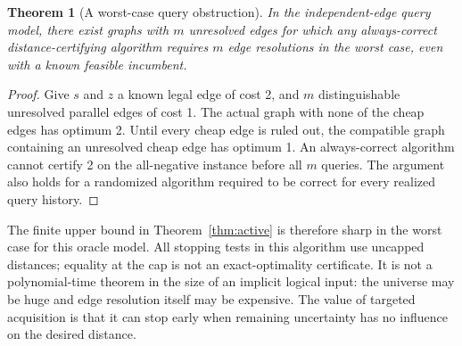 \documentclass[11pt]{article}
\newtheorem{theorem}{Theorem}[section]\newtheorem{proposition}[theorem]{Proposition}\newtheorem{lemma}[theorem]{Lemma}\newtheorem{corollary}[theorem]{Corollary}
\theoremstyle{definition}\newtheorem{definition}[theorem]{Definition}\newtheorem{example}[theorem]{Example}\newtheorem{conjecture}[theorem]{Conjecture}
\begin{document}
\begin{theorem}[A worst-case query obstruction]
In the independent-edge query model, there exist graphs with $m$ unresolved edges for which any always-correct distance-certifying algorithm requires $m$ edge resolutions in the worst case, even with a known feasible incumbent.
\end{theorem}
\begin{proof} Give $s$ and $z$ a known legal edge of cost 2, and $m$ distinguishable unresolved parallel edges of cost 1. The actual graph with none of the cheap edges has optimum 2. Until every cheap edge is ruled out, the compatible graph containing an unresolved cheap edge has optimum 1. An always-correct algorithm cannot certify 2 on the all-negative instance before all $m$ queries. The argument also holds for a randomized algorithm required to be correct for every realized query history.\end{proof}
The finite upper bound in Theorem~\ref{thm:active} is therefore sharp in the worst case for this oracle model. All stopping tests in this algorithm use uncapped distances; equality at the cap is not an exact-optimality certificate. It is not a polynomial-time theorem in the size of an implicit logical input: the universe may be huge and edge resolution itself may be expensive. The value of targeted acquisition is that it can stop early when remaining uncertainty has no influence on the desired distance.
\end{document}
